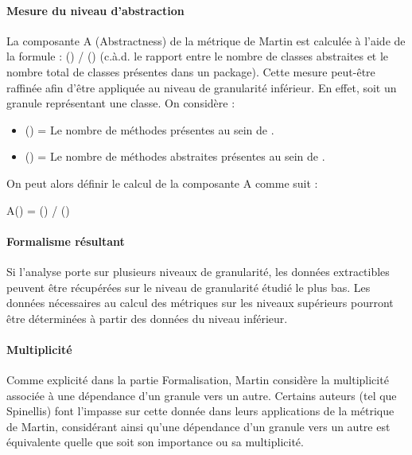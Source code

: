 \documentclass{scrartcl}
\begin{document}
    \paragraph{Mesure du niveau d'abstraction}La composante A (Abstractness) de la métrique de Martin est calculée à l'aide de la formule : 
    \numberOfabstractClass{}(\granule{}) / {\numberOfClass{}(\granule{})} (c.à.d. le rapport entre le nombre de classes abstraites et le nombre total de classes présentes dans un package). Cette mesure peut-être raffinée afin d'être appliquée au niveau de granularité inférieur. En effet, soit \granule{} un granule représentant une classe. On considère :
    \begin{itemize}
        \item \numberOfMethod{}(\granule{}{}) = Le nombre de méthodes présentes au sein de \granule{}.
        \item \numberOfabstractMethod{}(\granule{}) = Le nombre de méthodes abstraites présentes au sein de \granule{}.
    \end{itemize}
    On peut alors définir le calcul de la composante A comme suit :\\
    {\centering
        A(\granule{}) = \numberOfabstractMethod{}(\granule{}) / \numberOfMethod{}(\granule{}{})
    \par}
    
    \paragraph{Formalisme résultant}Si l'analyse porte sur plusieurs niveaux de granularité, les données extractibles peuvent être récupérées sur le niveau de granularité étudié le plus bas. Les données nécessaires au calcul des métriques sur les niveaux supérieurs pourront être déterminées à partir des données du niveau inférieur.
    
    \paragraph{Multiplicité}Comme explicité dans la partie Formalisation, Martin considère la multiplicité associée à une dépendance d'un granule vers un autre. Certains auteurs (tel que Spinellis\cite{Spinellis:2006}) font l'impasse sur cette donnée dans leurs applications de la métrique de Martin, considérant ainsi qu'une dépendance d'un granule vers un autre est équivalente quelle que soit son importance ou sa multiplicité.
\end{document}
